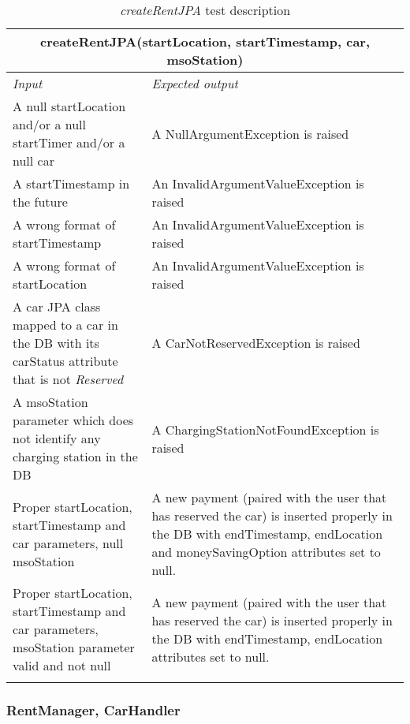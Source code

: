 \clearpage

\begin{longtable}{p{0.35\linewidth}p{0.65\linewidth}}
\multicolumn{2}{c}{\textbf{createRentJPA(startLocation, startTimestamp, car, msoStation)}} \\
\toprule
\emph{Input} & \emph{Expected output} \\
\midrule
A null startLocation and/or a null startTimer and/or a null car & A NullArgumentException is raised\\
\midrule
A startTimestamp in the future & An InvalidArgumentValueException is raised \\
\midrule
A wrong format of startTimestamp & An InvalidArgumentValueException is raised \\
\midrule
A wrong format of startLocation & An InvalidArgumentValueException is raised \\
\midrule
A car JPA class mapped to a car in the DB with its carStatus attribute that is not \emph{Reserved} & A CarNotReservedException is raised \\
\midrule
A msoStation parameter which does not identify any charging station in the DB & A ChargingStationNotFoundException is raised \\
\midrule
Proper startLocation, startTimestamp and car parameters, null msoStation & A new payment (paired with the user that has reserved the car) is inserted properly in the DB with endTimestamp, endLocation and moneySavingOption attributes set to null.\\
\midrule
Proper \mbox{startLocation}, startTimestamp and car parameters, \mbox{msoStation} parameter valid and not null & A new payment (paired with the user that has reserved the car) is inserted properly in the DB with endTimestamp, endLocation attributes set to null.\\
\bottomrule
\caption{\label{tbk:createRentJPA}\emph{createRentJPA} test description}
\end{longtable}


\clearpage

\subsubsection{RentManager, CarHandler}

